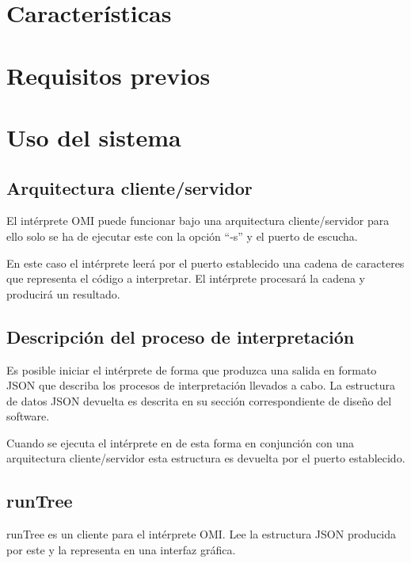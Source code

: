    

\section{Características}

\section{Requisitos previos}

\section {Uso del sistema}

\subsection{Arquitectura cliente/servidor}
El intérprete OMI puede funcionar bajo una arquitectura cliente/servidor para ello solo se ha de ejecutar este con la opción ``-s'' y el puerto de
escucha. 

En este caso el intérprete leerá por el puerto establecido una cadena de caracteres que representa el código a interpretar. El intérprete procesará 
la cadena y producirá un resultado.

\subsection{Descripción del proceso de interpretación}
Es posible iniciar el intérprete de forma que produzca una salida en formato JSON que describa los procesos de interpretación llevados a cabo. La estructura 
de datos JSON devuelta es descrita en su sección correspondiente de diseño del software.

Cuando se ejecuta el intérprete en de esta forma en conjunción con una arquitectura cliente/servidor esta estructura es devuelta por el puerto establecido. 

\subsection{runTree} 
runTree es un cliente para el intérprete OMI. Lee la estructura JSON producida por este y la representa en una interfaz gráfica. 

